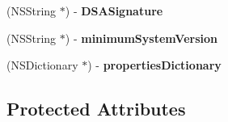 \begin{DoxyCompactItemize}
\mbox{\label{interface_s_u_appcast_item_a74d4c4027e69e62f7b50b2c392b96cd4}} 
(N\+S\+String $\ast$) -\/ {\bfseries D\+S\+A\+Signature}
\item 
\mbox{\label{interface_s_u_appcast_item_aaa2c008273686da9079bfc3e6a8ab59f}} 
(N\+S\+String $\ast$) -\/ {\bfseries minimum\+System\+Version}
\item 
\mbox{\label{interface_s_u_appcast_item_a56ce17727f6e4e95d1dbd9267e1ba85d}} 
(N\+S\+Dictionary $\ast$) -\/ {\bfseries properties\+Dictionary}
\end{DoxyCompactItemize}
\subsection*{Protected Attributes}
